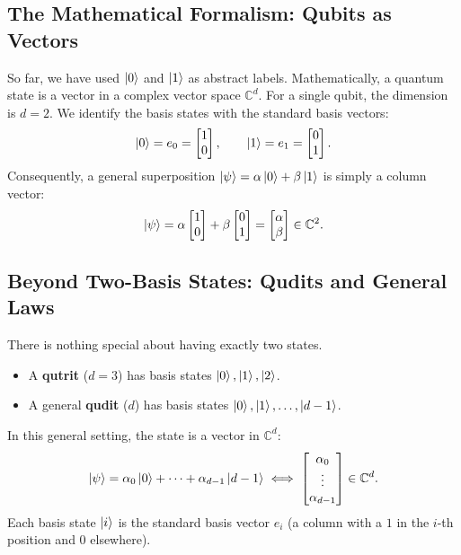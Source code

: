 \subsection{The Mathematical Formalism: Qubits as Vectors}

So far, we have used $\ket{0}$ and $\ket{1}$ as abstract labels. Mathematically, a quantum state is a vector in a complex vector space $\mathbb{C}^d$.
For a single qubit, the dimension is $d=2$. We identify the basis states with the standard basis vectors:
\[
    \ket{0} = e_0 = \begin{bmatrix} 1 \\ 0 \end{bmatrix}, \qquad
    \ket{1} = e_1 = \begin{bmatrix} 0 \\ 1 \end{bmatrix}.
\]
Consequently, a general superposition $\ket{\psi} = \alpha\ket{0} + \beta\ket{1}$ is simply a column vector:
\[
    \ket{\psi} = \alpha \begin{bmatrix} 1 \\ 0 \end{bmatrix} + \beta \begin{bmatrix} 0 \\ 1 \end{bmatrix} = \begin{bmatrix} \alpha \\ \beta \end{bmatrix} \in \mathbb{C}^2.
\]

\subsection{Beyond Two-Basis States: Qudits and General Laws}

There is nothing special about having exactly two states.
\begin{itemize}
    \item A \textbf{qutrit} ($d=3$) has basis states $\ket{0}, \ket{1}, \ket{2}$.
    \item A general \textbf{qudit} ($d$) has basis states $\ket{0}, \ket{1}, \dots, \ket{d-1}$.
\end{itemize}

In this general setting, the state is a vector in $\mathbb{C}^d$:
\[
    \ket{\psi} = \alpha_0\ket{0} + \dots + \alpha_{d-1}\ket{d-1} \iff \begin{bmatrix} \alpha_0 \\ \vdots \\ \alpha_{d-1} \end{bmatrix} \in \mathbb{C}^d.
\]
Each basis state $\ket{i}$ is the standard basis vector $e_i$ (a column with a $1$ in the $i$-th position and $0$ elsewhere).

